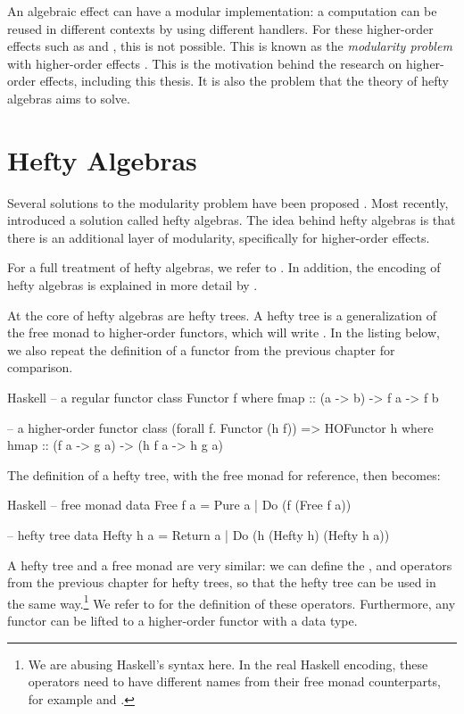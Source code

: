 An algebraic effect can have a modular implementation: a computation can be reused in different contexts by using different handlers. For these higher-order effects such as  and , this is not possible. This is known as the \emph{modularity problem} with higher-order effects \autocite{wu_effect_2014}. This is the motivation behind the research on higher-order effects, including this thesis. It is also the problem that the theory of hefty algebras aims to solve.

\section{Hefty Algebras}\label{sec:hefty_algebras}

Several solutions to the modularity problem have been proposed \autocite{wu_effect_2014,oh_latent_2021}. Most recently, \textcite{bach_poulsen_hefty_2023} introduced a solution called hefty algebras. The idea behind hefty algebras is that there is an additional layer of modularity, specifically for higher-order effects.

For a full treatment of hefty algebras, we refer to \textcite{bach_poulsen_hefty_2023}. In addition, the encoding of hefty algebras is explained in more detail by \textcite{bach_poulsen_algebras_2023}.

At the core of hefty algebras are hefty trees. A hefty tree is a generalization of the free monad to higher-order functors, which will write . In the listing below, we also repeat the definition of a functor from the previous chapter for comparison.

\begin{lst}{Haskell}
-- a regular functor
class Functor f where
  fmap :: (a -> b) -> f a -> f b

-- a higher-order functor
class (forall f. Functor (h f)) => HOFunctor h where
  hmap :: (f a -> g a) -> (h f a -> h g a)
\end{lst}
%
The definition of a hefty tree, with the free monad for reference, then becomes:

\begin{lst}{Haskell}
-- free monad
data Free f a
  = Pure a
  | Do (f (Free f a))

-- hefty tree
data Hefty h a
  = Return a
  | Do (h (Hefty h) (Hefty h a))
\end{lst}
%
A hefty tree and a free monad are very similar: we can define the \hs{>>=}, \hs{<} and \hs{+} operators from the previous chapter for hefty trees, so that the hefty tree can be used in the same way.\footnote{We are abusing Haskell's syntax here. In the real Haskell encoding, these operators need to have different names from their free monad counterparts, for example \hs{:+} and \hs{:<}.} We refer to \textcite{bach_poulsen_hefty_2023} for the definition of these operators. Furthermore, any functor can be lifted to a higher-order functor with a  data type.

